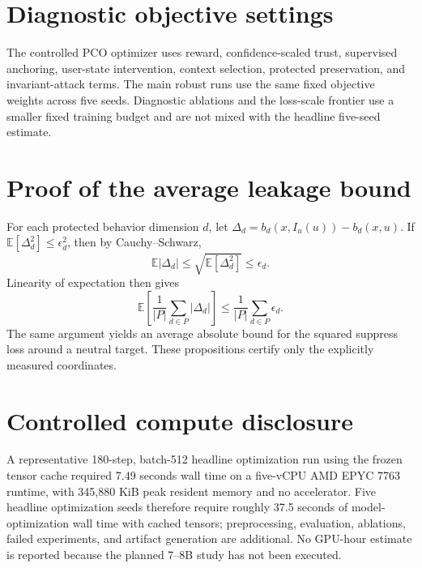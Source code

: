 \appendix
\section{Diagnostic objective settings}
The controlled PCO optimizer uses reward, confidence-scaled trust, supervised anchoring, user-state intervention, context selection, protected preservation, and invariant-attack terms. The main robust runs use the same fixed objective weights across five seeds. Diagnostic ablations and the loss-scale frontier use a smaller fixed training budget and are not mixed with the headline five-seed estimate.

\section{Proof of the average leakage bound}
For each protected behavior dimension $d$, let $\Delta_d=b_d(x,I_u(u))-b_d(x,u)$. If $\mathbb{E}[\Delta_d^2]\le\epsilon_d^2$, then by Cauchy--Schwarz,
\begin{equation}
\mathbb{E}|\Delta_d| \le \sqrt{\mathbb{E}[\Delta_d^2]} \le \epsilon_d.
\end{equation}
Linearity of expectation then gives
\begin{equation}
\mathbb{E}\left[\frac{1}{|P|}\sum_{d\in P}|\Delta_d|\right]
\le \frac{1}{|P|}\sum_{d\in P}\epsilon_d.
\end{equation}
The same argument yields an average absolute bound for the squared suppress loss around a neutral target. These propositions certify only the explicitly measured coordinates.

\section{Controlled compute disclosure}
A representative 180-step, batch-512 headline optimization run using the frozen tensor cache required 7.49 seconds wall time on a five-vCPU AMD EPYC 7763 runtime, with 345,880 KiB peak resident memory and no accelerator. Five headline optimization seeds therefore require roughly 37.5 seconds of model-optimization wall time with cached tensors; preprocessing, evaluation, ablations, failed experiments, and artifact generation are additional. No GPU-hour estimate is reported because the planned 7--8B study has not been executed.


